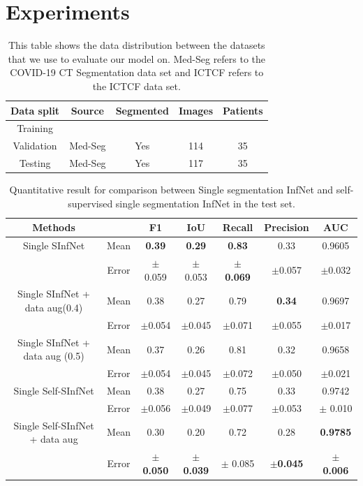\section{Experiments}

\begin{table}[!h]
	\centering
	\begin{tabular}{|c||c|c|c|c|} \hline
		Data split & Source & Segmented & Images & Patients \\\hline
		Training & \vtop{\hbox{\strut Med-Seg}\hbox{\strut ICTCF}}&
		\vtop{\hbox{\strut Yes}\hbox{\strut No}} & 
		\vtop{\hbox{\strut 698}\hbox{\strut 6654}}&
		\vtop{\hbox{\strut 39}\hbox{\strut 1338}}\\\hline
		Validation & Med-Seg & Yes & 114 & 35 \\\hline
		Testing & Med-Seg & Yes & 117 & 35 \\\hline
	\end{tabular}
	\caption{This table shows the data distribution between the datasets that we use to evaluate our model on. Med-Seg refers to the COVID-19 CT Segmentation data set and ICTCF refers to the ICTCF data set.}
	\label{tab:dataset}
\end{table}

\begin{table}[!h]
	\centering
	\begin{tabular}{| c | c || c c c c c ||}
		\hline
		Methods & & F1 & IoU & Recall & Precision & AUC \\ \hline
		Single SInfNet &  Mean & \textbf{0.39} & \textbf{0.29} & \textbf{0.83} & 0.33 & 0.9605 \\ \cline{2-7}
		& Error & $\pm$ 0.059 & $\pm$ 0.053 & $\pm$ \textbf{0.069} & $\pm$0.057  & $\pm$0.032 \\ \hline
		Single SInfNet + data aug(0.4) &  Mean & 0.38 & 0.27 & 0.79 & \textbf{0.34} & 0.9697 \\ \cline{2-7}
		& Error & $\pm$0.054  & $\pm$0.045  &$\pm$0.071 &$\pm$0.055 &$\pm$0.017 \\ \hline
		Single SInfNet + data aug (0.5) &  Mean & 0.37 & 0.26 & 0.81 & 0.32 & 0.9658 \\ \cline{2-7}
		& Error &$\pm$0.054 &$\pm$0.045 &$\pm$0.072 &$\pm$0.050 &  $\pm$0.021  \\ \hline \hline
		Single Self-SInfNet &  Mean & 0.38 & 0.27 & 0.75 & 0.33 & 0.9742  \\ \cline{2-7}
		& Error & $\pm$0.056 & $\pm$0.049 &$\pm$0.077  & $\pm$0.053 & $\pm$  0.010 \\ \hline
		Single Self-SInfNet + data aug &  Mean & 0.30 & 0.20 & 0.72 & 0.28 &  \textbf{0.9785} \\ \cline{2-7}
		& Error & $\pm$ \textbf{0.050}  & $\pm$  \textbf{0.039} & $\pm$ 0.085 & $\pm$\textbf{0.045} & $\pm$ \textbf{0.006}  \\ \hline
	\end{tabular}
	\caption{Quantitative result for comparison between Single segmentation InfNet and self-supervised single segmentation InfNet in the test set.}
	\label{tab:single}
\end{table}

